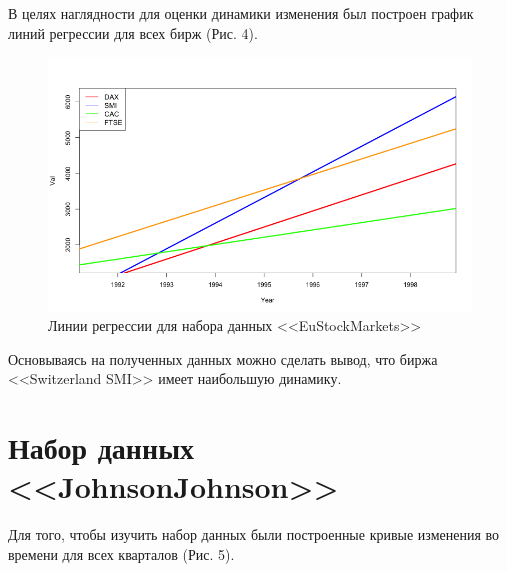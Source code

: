 \documentclass[]{article}
\numberwithin{equation}{section}
\begin{document}
    В целях наглядности для оценки динамики изменения был построен график линий регрессии для всех бирж (Рис. 4).

    \begin{figure}[H]
        \centering
        \includegraphics[width = 0.9\linewidth]{data/stockmark_reg_lines.png}
        \caption{Линии регрессии для набора данных <<EuStockMarkets>>}
    \end{figure}

    Основываясь на полученных данных можно сделать вывод, что биржа <<Switzerland SMI>> имеет наибольшую динамику.

    \section{Набор данных <<JohnsonJohnson>>}

    Для того, чтобы изучить набор данных были построенные кривые изменения во времени для всех кварталов (Рис. 5).
\end{document}
